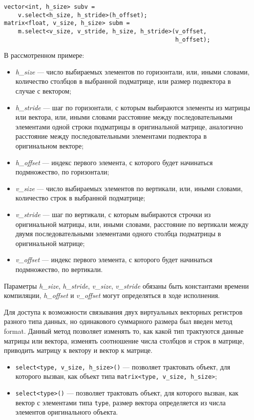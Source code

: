 \begin{lstlisting}
vector<int, h_size> subv =
    v.select<h_size, h_stride>(h_offset);
matrix<float, v_size, h_size> subm =
    m.select<v_size, v_stride, h_size, h_stride>(v_offset,
                                                 h_offset);
\end{lstlisting}

В рассмотренном примере:

\begin{itemize}
    \item \textit{h\_size} --- число выбираемых элементов по горизонтали, или, иными словами, количество столбцов в выбранной подматрице, или размер подвектора в случае с вектором;
    \item \textit{h\_stride} --- шаг по горизонтали, с которым выбираются элементы из матрицы или вектора, или, иными словами расстояние между последовательными элементами одной строки подматрицы в оригинальной матрице, аналогично расстояние между последовательными элементами подвектора в оригинальном векторе;
    \item \textit{h\_offset} --- индекс первого элемента, с которого будет начинаться подмножество, по горизонтали;
    \item \textit{v\_size} --- число выбираемых элементов по вертикали, или, иными словами, количество строк в выбранной подматрице;
    \item \textit{v\_stride} --- шаг по вертикали, с которым выбираются строчки из оригинальной матрицы, или, иными словами, расстояние по вертикали между двумя последовательными элементами одного столбца подматрицы в оригинальной матрице;
    \item \textit{v\_offset} --- индекс первого элемента, с которого будет начинаться подмножество, по вертикали.
\end{itemize}

Параметры \textit{h\_size}, \textit{h\_stride}, \textit{v\_size}, \textit{v\_stride} обязаны быть константами времени компиляции, \textit{h\_offset} и \textit{v\_offset} могут определяться в ходе исполнения.

Для доступа к возможности связывания двух виртуальных векторных регистров разного типа данных, но одинакового суммарного размера был введен метод format.
Данный метод позволяет изменять то, как какой тип трактуются данные матрицы или вектора, изменять соотношение числа столбцов и строк в матрице, приводить матрицу к вектору и вектор к матрице.

\begin{itemize}
    \item \verb|select<type, v_size, h_size>()| --- позволяет трактовать объект, для которого вызван, как объект типа \verb|matrix<type, v_size, h_size>|;
    \item \verb|select<type>()| --- позволяет трактовать объект, для которого вызван, как вектор с элементами типа \verb|type|, размер вектора определяется из числа элементов оригинального объекта.
\end{itemize}

